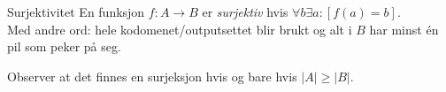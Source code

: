 \begin{frame}{Surjektivitet}
En funksjon $f : A \rightarrow B$ er \emph{surjektiv} hvis $\forall b \exists a: [f(a) = b]$.\\
Med andre ord: hele kodomenet/outputsettet blir brukt og alt i $B$ har minst én pil som peker på seg.
    \begin{figure}%
        \centering
        \pause
        \qquad
        \pause
        \qquad
        \label{fig:sur}
    \end{figure}
    \pause
    Observer at det finnes en surjeksjon hvis og bare hvis $|A| \geq |B|$.
\end{frame}

